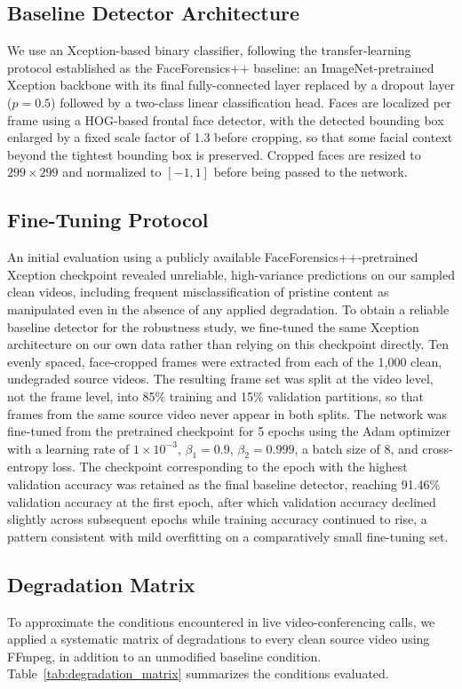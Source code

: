 \documentclass[conference]{IEEEtran}
\begin{document}
\subsection{Baseline Detector Architecture}
We use an Xception-based binary classifier, following the transfer-learning protocol established as the FaceForensics++ baseline: an ImageNet-pretrained Xception backbone with its final fully-connected layer replaced by a dropout layer ($p=0.5$) followed by a two-class linear classification head. Faces are localized per frame using a HOG-based frontal face detector, with the detected bounding box enlarged by a fixed scale factor of 1.3 before cropping, so that some facial context beyond the tightest bounding box is preserved. Cropped faces are resized to $299\times299$ and normalized to $[-1, 1]$ before being passed to the network.

\subsection{Fine-Tuning Protocol}
An initial evaluation using a publicly available FaceForensics++-pretrained Xception checkpoint revealed unreliable, high-variance predictions on our sampled clean videos, including frequent misclassification of pristine content as manipulated even in the absence of any applied degradation. To obtain a reliable baseline detector for the robustness study, we fine-tuned the same Xception architecture on our own data rather than relying on this checkpoint directly. Ten evenly spaced, face-cropped frames were extracted from each of the 1,000 clean, undegraded source videos. The resulting frame set was split at the video level, not the frame level, into 85\% training and 15\% validation partitions, so that frames from the same source video never appear in both splits. The network was fine-tuned from the pretrained checkpoint for 5 epochs using the Adam optimizer with a learning rate of $1\times10^{-3}$, $\beta_1=0.9$, $\beta_2=0.999$, a batch size of 8, and cross-entropy loss. The checkpoint corresponding to the epoch with the highest validation accuracy was retained as the final baseline detector, reaching 91.46\% validation accuracy at the first epoch, after which validation accuracy declined slightly across subsequent epochs while training accuracy continued to rise, a pattern consistent with mild overfitting on a comparatively small fine-tuning set.

\subsection{Degradation Matrix}
To approximate the conditions encountered in live video-conferencing calls, we applied a systematic matrix of degradations to every clean source video using FFmpeg, in addition to an unmodified baseline condition. Table~\ref{tab:degradation_matrix} summarizes the conditions evaluated.
\end{document}
